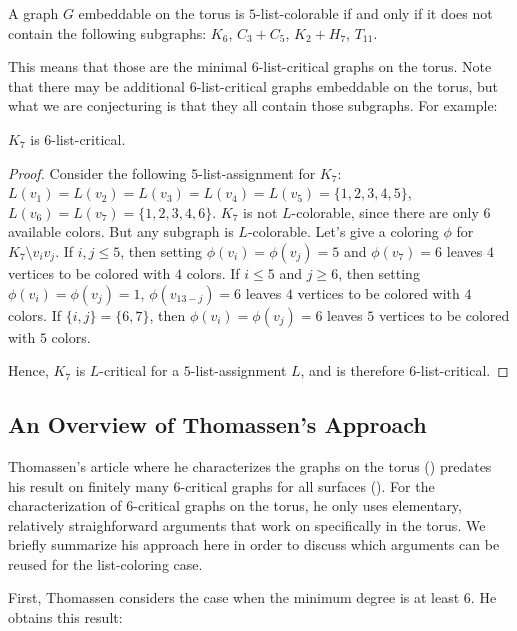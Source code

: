 \begin{conjecture}
\label{torusconjecture}
A graph $G$ embeddable on the torus is $5$-list-colorable if and only if 
it does not contain the following subgraphs: $K_6$, $C_3 + C_5$, $K_2 + H_7$, $T_{11}$.
\end{conjecture}

This means that those are the minimal $6$-list-critical graphs on the torus. Note 
that there may be additional $6$-list-critical graphs embeddable on the torus, but what we are conjecturing is that they all 
contain those subgraphs. For example:

\begin{observation}
$K_7$ is $6$-list-critical.
\end{observation}

\begin{proof}
Consider the following $5$-list-assignment for $K_7$: $L(v_1) = L(v_2) = L(v_3) = L(v_4) = L(v_5) = \{1, 2, 3, 4, 5\}$, 
$L(v_6) = L(v_7) = \{1, 2, 3, 4, 6\}$. $K_7$ is not $L$-colorable, since there are only $6$ available colors. 
But any subgraph is $L$-colorable. Let's give a coloring $\phi$ for $K_7 \setminus v_iv_j$. If $i, j \leq 5$, 
then setting $\phi(v_i) = \phi(v_j) = 5$ and $\phi(v_7) = 6$ leaves $4$ vertices to be colored with $4$ colors. 
If $i \leq 5$ and $j \geq 6$, then setting $\phi(v_i) = \phi(v_j) = 1$, $\phi(v_{13-j}) = 6$ leaves $4$ vertices 
to be colored with $4$ colors. If $\{i, j\} = \{6, 7\}$, then $\phi(v_i) = \phi(v_j) = 6$ leaves $5$ vertices 
to be colored with $5$ colors.

Hence, $K_7$ is $L$-critical for a $5$-list-assignment $L$, and is therefore $6$-list-critical.
\end{proof}

\subsection{An Overview of Thomassen's Approach}

Thomassen's article where he characterizes the graphs on the torus (\cite{thomassentorus}) predates 
his result on finitely many $6$-critical graphs for all surfaces (\cite{thomassenfixedsurface}). 
For the characterization of $6$-critical graphs on the torus, he only uses elementary, relatively 
straighforward arguments that work on specifically in the torus. We briefly summarize his 
approach here in order to discuss which arguments can be reused for the list-coloring case. 

First, Thomassen considers the case when the minimum degree is at least $6$. 
He obtains this result:

